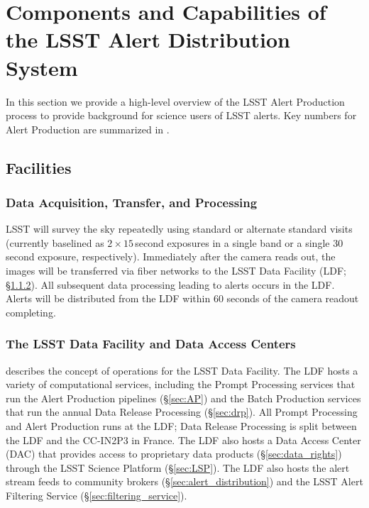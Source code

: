\section{Components and Capabilities of the LSST Alert Distribution System}\label{sec:components}

In this section we provide a high-level overview of the LSST Alert Production process to provide background for science users of LSST alerts.
Key numbers for Alert Production are summarized in .

\subsection{Facilities}

\subsubsection{Data Acquisition, Transfer, and Processing}

LSST will survey the sky repeatedly using standard or alternate standard visits (currently baselined as $2\times15$\,second exposures in a single band or a single 30\,second exposure, respectively).
Immediately after the camera reads out, the images will be transferred via fiber networks to the LSST Data Facility (LDF; \S \ref{sec:LDF}).
All subsequent data processing leading to alerts occurs in the LDF.
Alerts will be distributed from the LDF within 60 seconds of the camera readout completing.

\subsubsection{The LSST Data Facility and Data Access Centers} \label{sec:LDF}

 describes the concept of operations for the LSST Data Facility.
The LDF hosts a variety of computational services, including the Prompt Processing services that run the Alert Production pipelines (\S \ref{sec:AP}) and the Batch Production services that run the annual Data Release Processing (\S \ref{sec:drp}).
All Prompt Processing and Alert Production runs at the LDF;
Data Release Processing is split between the LDF and the CC-IN2P3 in France.
The LDF also hosts a Data Access Center (DAC) that provides access to proprietary data products (\S \ref{sec:data_rights}) through the LSST Science Platform (\S \ref{sec:LSP}).
The LDF also hosts the alert stream feeds to community brokers (\S \ref{sec:alert_distribution}) and the LSST Alert Filtering Service (\S \ref{sec:filtering_service}).

